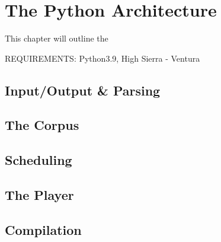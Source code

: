 \chapter{The Python Architecture}\label{sec:2-python-architecture}
This chapter will outline the 

REQUIREMENTS: Python3.9, High Sierra - Ventura


\section{Input/Output \& Parsing}\label{ssec:2-io-parsing}

\section{The Corpus}\label{ssec:2-corpus}

\section{Scheduling}\label{ssec:2-scheduling}

\section{The Player}\label{ssec:2-player}

\section{Compilation}\label{ssec:2-compilation}

